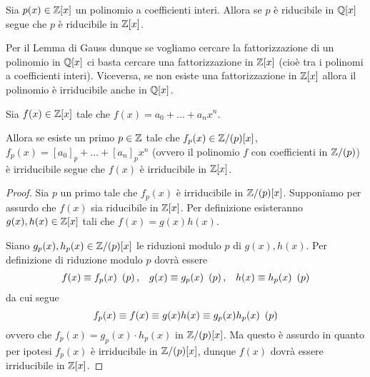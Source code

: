\begin{theorem}
     \label{lemma_di_Gauss}
    Sia $p(x) \in \mathbb{Z}[x]$ un polinomio a coefficienti interi. Allora se $p$ è riducibile in $\mathbb{Q}[x]$ segue che $p$ è riducibile in $\mathbb{Z}[x]$.
\end{theorem}

Per il Lemma di Gauss dunque se vogliamo cercare la fattorizzazione di un polinomio in $\mathbb{Q}[x]$ ci basta cercare una fattorizzazione in $\mathbb{Z}[x]$ (cioè tra i polinomi a coefficienti interi). Viceversa, se non esiste una fattorizzazione in $\mathbb{Z}[x]$ allora il polinomio è irriducibile anche in $\mathbb{Q}[x]$.
\begin{proposition}
     \label{criterio_riduzione}
    Sia $f(x) \in \mathbb{Z}[x]$ tale che $f(x) = a_0 + \dots + a_nx^n$. 
    
    Allora se esiste un primo $p \in \mathbb{Z}$ tale che $f_p(x) \in \mathbb{Z}/(p)[x]$, $f_p(x) = [a_0]_p + \dots + [a_n]_px^n $ (ovvero il polinomio $f$ con coefficienti in $\mathbb{Z}/(p)$) è irriducibile segue che $f(x)$ è irriducibile in $\mathbb{Z}[x]$.
\end{proposition}
\begin{proof}
    Sia $p$ un primo tale che $f_p(x)$ è irriducibile in $\mathbb{Z}/(p)[x]$. Supponiamo per assurdo che $f(x)$ sia riducibile in $\mathbb{Z}[x]$. Per definizione esisteranno $g(x), h(x) \in \mathbb{Z}[x]$ tali che $f(x) = g(x)h(x)$.

    Siano $g_p(x), h_p(x) \in \mathbb{Z}/(p)[x]$ le riduzioni modulo $p$ di $g(x), h(x)$. Per definizione di riduzione modulo $p$ dovrà essere \begin{align*}
        f(x) \equiv f_p(x) \ \left(p\right), &&g(x) \equiv g_p(x) \ \left(p\right), &&h(x) \equiv h_p(x) \ \left(p\right)
    \end{align*} da cui segue \[
        f_p(x) \equiv f(x) \equiv g(x)h(x) \equiv g_p(x)h_p(x) \ \left(p\right)    
    \] ovvero che $f_p(x) = g_p(x) \cdot h_p(x)$ in $\mathbb{Z}/(p)[x]$. Ma questo è assurdo in quanto per ipotesi $f_p(x)$ è irriducibile in $\mathbb{Z}/(p)[x]$, dunque $f(x)$ dovrà essere irriducibile in $\mathbb{Z}[x]$.
\end{proof}

